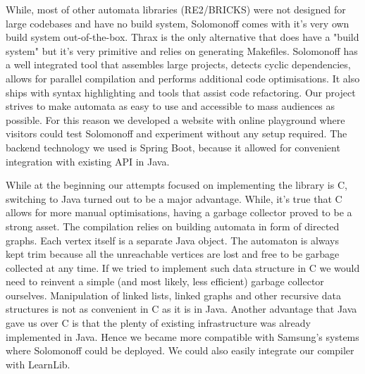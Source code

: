While, most of other automata libraries (RE2/BRICKS) were not designed for large codebases and have no build system, Solomonoff comes with it's very own build system out-of-the-box. Thrax is the only alternative that does have a "build system" but it's very primitive and relies on generating Makefiles. Solomonoff has a well integrated tool that assembles large projects, detects cyclic dependencies, allows for parallel compilation and performs additional code optimisations. It also ships with syntax highlighting and tools that assist code refactoring. Our project strives to make automata as easy to use and accessible to mass audiences as possible. For this reason we developed a website with online playground where visitors could test Solomonoff and experiment without any setup required. The backend technology we used is Spring Boot, because it allowed for convenient integration with existing API in Java. 

While at the beginning our attempts focused on implementing the library is C, switching to Java turned out to be a major advantage. While, it's true that C allows for more manual optimisations, having a garbage collector proved to be a strong asset. The compilation relies on building automata in form of directed graphs. Each vertex itself is a separate Java object. The automaton is always kept trim because all the unreachable vertices are lost and free to be garbage collected at any time. If we tried to implement such data structure in C we would need to reinvent a simple (and most likely, less efficient) garbage collector ourselves. Manipulation of linked lists, linked graphs and other recursive data structures is not as convenient in C as it is in Java. Another advantage that Java gave us over C is that the plenty of existing infrastructure was already implemented in Java. Hence we became more compatible with Samsung's systems where Solomonoff could be deployed. We could also easily integrate our compiler with LearnLib. 


